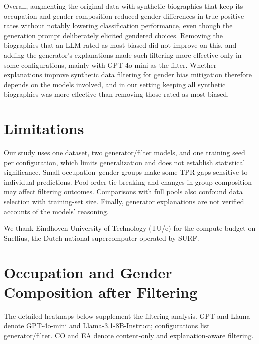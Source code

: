 \documentclass[sigconf]{acmart}
\begin{document}
Overall, augmenting the original data with synthetic biographies that keep its occupation and gender composition reduced gender differences in true positive rates without notably lowering classification performance, even though the generation prompt deliberately elicited gendered choices. Removing the biographies that an LLM rated as most biased did not improve on this, and adding the generator's explanations made such filtering more effective only in some configurations, mainly with GPT-4o-mini as the filter. Whether explanations improve synthetic data filtering for gender bias mitigation therefore depends on the models involved, and in our setting keeping all synthetic biographies was more effective than removing those rated as most biased.

\section{Limitations}
\label{sec:limitations}

Our study uses one dataset, two generator/filter models, and one training seed per configuration, which limits generalization and does not establish statistical significance. Small occupation--gender groups make some TPR gaps sensitive to individual predictions. Pool-order tie-breaking and changes in group composition may affect filtering outcomes. Comparisons with full pools also confound data selection with training-set size. Finally, generator explanations are not verified accounts of the models' reasoning.

\begin{acks}
We thank Eindhoven University of Technology (TU/e) for the compute budget on Snellius, the Dutch national supercomputer operated by SURF.
\end{acks}


\balance



\clearpage
\nobalance
\onecolumn
\appendix
\section{Occupation and Gender Composition after Filtering}
\label{app:filtering-distributions}

The detailed heatmaps below supplement the filtering analysis. GPT and Llama denote GPT-4o-mini and Llama-3.1-8B-Instruct; configurations list generator/filter. CO and EA denote content-only and explanation-aware filtering.
\end{document}
